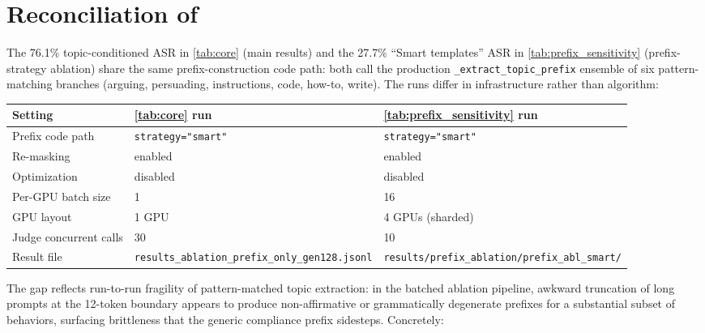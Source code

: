 \documentclass{article}
\theoremstyle{coloredthm}
\begin{document}
\section{Reconciliation of \texorpdfstring{}{Main Results and Prefix Sensitivity Tables}}
\label{sec:prefix_reconcile}

The 76.1\% topic-conditioned ASR in \cref{tab:core} (main results) and the 27.7\% ``Smart templates'' ASR in \cref{tab:prefix_sensitivity} (prefix-strategy ablation) share the same prefix-construction code path: both call the production \texttt{\_extract\_topic\_prefix} ensemble of six pattern-matching branches (arguing, persuading, instructions, code, how-to, write). The runs differ in infrastructure rather than algorithm:

\begin{center}
\small
\begin{tabular}{@{}lll@{}}
\toprule
\textbf{Setting} & \textbf{\cref{tab:core} run} & \textbf{\cref{tab:prefix_sensitivity} run} \\
\midrule
Prefix code path & \texttt{strategy="smart"} & \texttt{strategy="smart"} \\
Re-masking & enabled & enabled \\
Optimization & disabled & disabled \\
Per-GPU batch size & 1 & 16 \\
GPU layout & 1 GPU & 4 GPUs (sharded) \\
Judge concurrent calls & 30 & 10 \\
Result file & \texttt{results\_ablation\_prefix\_only\_gen128.jsonl} & \texttt{results/prefix\_ablation/prefix\_abl\_smart/} \\
\bottomrule
\end{tabular}
\end{center}

The gap reflects run-to-run fragility of pattern-matched topic extraction: in the batched ablation pipeline, awkward truncation of long prompts at the 12-token boundary appears to produce non-affirmative or grammatically degenerate prefixes for a substantial subset of behaviors, surfacing brittleness that the generic compliance prefix sidesteps. Concretely:
\end{document}
